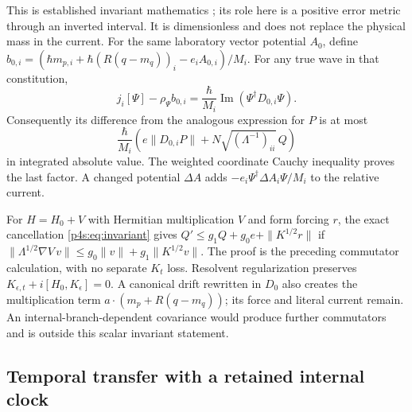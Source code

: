 \documentclass[11pt]{article}
\numberwithin{equation}{section}
\theoremstyle{definition}
\theoremstyle{remark}
\begin{document}
This is established invariant mathematics
\cite{Lewis1967,LewisRiesenfeld1969}; its role here is a positive
error metric through an inverted interval. It is dimensionless and
does not replace the physical mass in the current. For the same
laboratory vector potential $A_0$, define
$b_{0,i}=(\hbar m_{p,i}+\hbar(R(q-m_q))_i-e_iA_{0,i})/M_i$.
For any true wave in that constitution,
\[
 j_i[\Psi]-\rho_\Psi b_{0,i}
       =\frac{\hbar}{M_i}\operatorname{Im}(\Psi^\dagger D_{0,i}\Psi).
\]
Consequently its difference from the analogous expression for $P$ is
at most
\begin{equation}\label{p4s:eq:invariantcurrent}
 \frac{\hbar}{M_i}
 \left(e\|D_{0,i}P\|
             +N\sqrt{(\Lambda^{-1})_{ii}}\,Q\right)
\end{equation}
in integrated absolute value. The weighted coordinate Cauchy
inequality proves the last factor. A changed potential $\Delta A$
adds $-e_i\Psi^\dagger\Delta A_i\Psi/M_i$ to the relative current.

For $H=H_0+V$ with Hermitian multiplication $V$ and form forcing $r$,
the exact cancellation \eqref{p4s:eq:invariant} gives
$Q'\leq g_1Q+g_0e+\|K^{1/2}r\|$ if
$\|\Lambda^{1/2}\nabla V\,v\|\leq g_0\|v\|+g_1\|K^{1/2}v\|$.
The proof is the preceding commutator calculation, with no separate
$K_t$ loss. Resolvent regularization preserves
$K_{\epsilon,t}+i[H_0,K_\epsilon]=0$.
A canonical drift rewritten in $D_0$ also creates the multiplication
term $a\cdot(m_p+R(q-m_q))$; its force and literal current remain.
An internal-branch-dependent covariance would produce further
commutators and is outside this scalar invariant statement.

\subsection{Temporal transfer with a retained internal clock}
\end{document}

